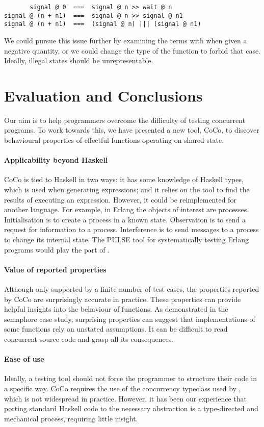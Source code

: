 \begin{verbatim}
       signal @ 0  ===  signal @ n >> wait @ n
signal @ (n + n1)  ===  signal @ n >> signal @ n1
signal @ (n + n1)  ===  (signal @ n) ||| (signal @ n1)
\end{verbatim}

We could pursue this issue further by examining the terms with
\dejafu{} when given a negative quantity, or we could change the type
of the function to forbid that case.  Ideally, illegal states should
be unrepresentable.

\section{Evaluation and Conclusions}
\label{sec:coco-conclusions}

Our aim is to help programmers overcome the difficulty of testing
concurrent programs.  To work towards this, we have presented a new
tool, CoCo, to discover behavioural properties of effectful functions
operating on shared state.

\paragraph{Applicability beyond Haskell}
CoCo is tied to Haskell in two ways: it has some knowledge of Haskell
types, which is used when generating expressions; and it relies on the
\dejafu{} tool to find the results of executing an expression.
However, it could be reimplemented for another language.  For example,
in Erlang the objects of interest are processes.  Initialisation is to
create a process in a known state.  Observation is to send a request
for information to a process.  Interference is to send messages to a
process to change its internal state.  The PULSE tool for
systematically testing Erlang programs\cite{claessen2009} would play
the part of \dejafu{}.

\paragraph{Value of reported properties}
Although only supported by a finite number of test cases, the
properties reported by CoCo are surprisingly accurate in practice.
These properties can provide helpful insights into the behaviour of
functions.  As demonstrated in the semaphore case study, surprising
properties can suggest that implementations of some functions rely on
unstated assumptions.  It can be difficult to read concurrent source
code and grasp all its consequences.

\paragraph{Ease of use}
Ideally, a testing tool should not force the programmer to structure
their code in a specific way.  CoCo requires the use of the
concurrency typeclass used by \dejafu{}, which is not widespread in
practice.  However, it has been our experience that porting standard
Haskell code to the necessary abstraction is a type-directed and
mechanical process, requiring little insight.
